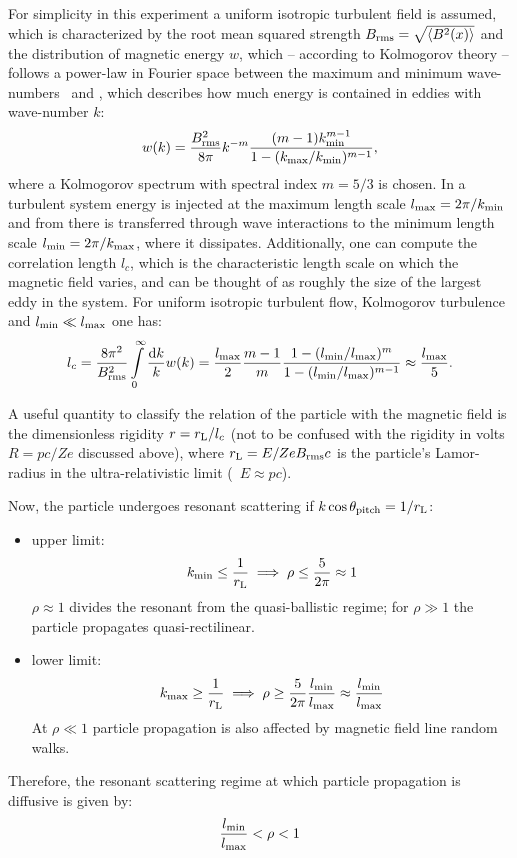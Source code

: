 For simplicity in this experiment a uniform isotropic turbulent field is
assumed, which is characterized by the root mean squared strength
$B_{\mathrm{rms}}=\sqrt{\langle{B^2(x)}\rangle}$ and the distribution of magnetic energy
$w$, which -- according to Kolmogorov theory -- follows a power-law in Fourier
space between the maximum and minimum wave-numbers \kmin~and \kmax, which
describes how much energy is contained in eddies with wave-number $k$:
\begin{equation}
    w(k)=\frac{B_{\mathrm{rms}}^2}{8\pi}k^{-m}\frac{(m-1)k_{\mathrm{min}}^{m-1}}{1-(k_{\mathrm{max}}/k_{\mathrm{min}})^{m-1}},
\end{equation}
where a Kolmogorov spectrum with spectral index $m=5/3$ is chosen.
In a turbulent system energy is injected at the maximum length scale
$l_{\mathrm{max}}=2\pi/k_{\mathrm{min}}$ and from there is transferred through wave interactions to
the minimum length scale $l_{\mathrm{min}}=2\pi/k_{\mathrm{max}}$, where it dissipates.
Additionally, one can compute the correlation length $l_c$, which is the
characteristic length scale on which the magnetic field varies, and can be
thought of as roughly the size of the largest eddy in the system. For uniform
isotropic turbulent flow, Kolmogorov turbulence and $l_{\mathrm{min}}\ll l_{\mathrm{max}}$ one has:
\begin{equation}
    l_c=\frac{8\pi^2}{B_{\mathrm{rms}}^2}\int\limits_{0}^{\infty}\frac{\dd{k}}{k}w(k)
    =\frac{l_{\mathrm{max}}}{2}\frac{m-1}{m}\frac{1-(l_{\mathrm{min}}/l_{\mathrm{max}})^m}{1-(l_{\mathrm{min}}/l_{\mathrm{max}})^{m-1}}
    \approx\frac{l_{\mathrm{max}}}{5}.
\end{equation}

A useful quantity to classify the relation of the particle with the magnetic
field is the dimensionless rigidity $r=r_{\mathrm{L}}/l_c$ (not to be confused with the
rigidity in volts $R=pc/Ze$ discussed above), where $r_{\mathrm{L}}=E/ZeB_{\mathrm{rms}} c$ is the
particle's Lamor-radius in the ultra-relativistic limit (\ie~$E\approx pc$).

Now, the particle undergoes resonant scattering if $k\cos\theta_{\mathrm{pitch}}=1/r_{\mathrm{L}}$:
\begin{itemize}
    \item upper limit:
        \[k_{\mathrm{min}}\le\frac{1}{r_{\mathrm{L}}} \implies \rho\le\frac{5}{2\pi}\approx1\]
        $\rho\approx1$ divides the resonant from the quasi-ballistic regime; for
        $\rho\gg1$ the particle propagates quasi-rectilinear.
    \item lower limit:
        \[k_{\mathrm{max}}\ge\frac{1}{r_{\mathrm{L}}} \implies
            \rho\ge\frac{5}{2\pi}\frac{l_{\mathrm{min}}}{l_{\mathrm{max}}}\approx\frac{l_{\mathrm{min}}}{l_{\mathrm{max}}}\]
        At $\rho\ll1$ particle propagation is also affected by magnetic field
        line random walks.
\end{itemize}
Therefore, the resonant scattering regime at which particle propagation is
diffusive is given by:
\begin{equation}
    \frac{l_{\mathrm{min}}}{l_{\mathrm{max}}}<\rho<1
    \label{eq:resontant-scattering}
\end{equation}


